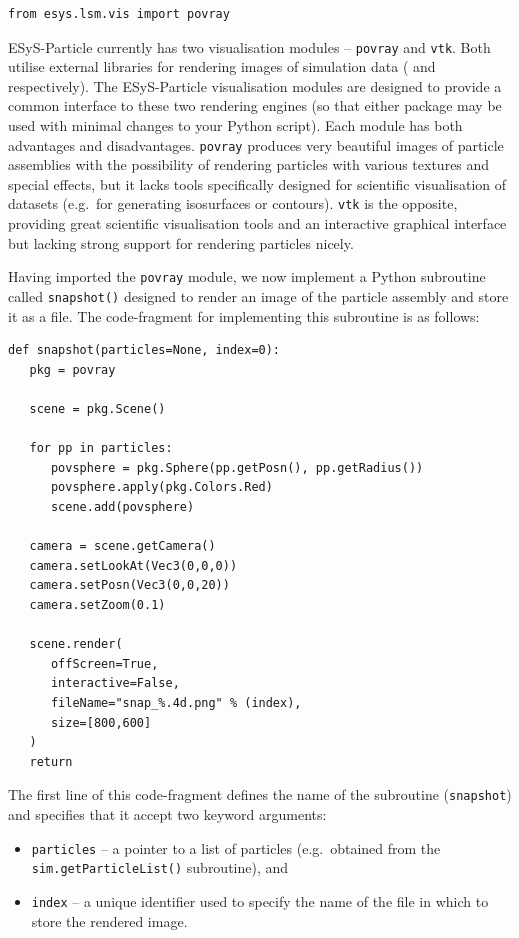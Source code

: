 \begin{verbatim}
from esys.lsm.vis import povray
\end{verbatim}

\noindent
ESyS-Particle currently has two visualisation modules -- \texttt{povray} and \texttt{vtk}. Both utilise external libraries for rendering images of simulation data ( and  respectively). The ESyS-Particle visualisation modules are designed to provide a common interface to these two rendering engines (so that either package may be used with minimal changes to your Python script). Each module has both advantages and disadvantages. \texttt{povray} produces very beautiful images of particle assemblies with the possibility of rendering particles with various textures and special effects, but it lacks tools specifically designed for scientific visualisation of datasets (e.g.\ for generating isosurfaces or contours). \texttt{vtk} is the opposite, providing great scientific visualisation tools and an interactive graphical interface but lacking strong support for rendering particles nicely. 

Having imported the \texttt{povray} module, we now implement a Python subroutine called \texttt{snapshot()} designed to render an image of the particle assembly and store it as a file. The code-fragment for implementing this subroutine is as follows:

\begin{verbatim}
def snapshot(particles=None, index=0):
   pkg = povray

   scene = pkg.Scene()

   for pp in particles:
      povsphere = pkg.Sphere(pp.getPosn(), pp.getRadius())
      povsphere.apply(pkg.Colors.Red)
      scene.add(povsphere)

   camera = scene.getCamera()
   camera.setLookAt(Vec3(0,0,0))
   camera.setPosn(Vec3(0,0,20))
   camera.setZoom(0.1)

   scene.render(
      offScreen=True, 
      interactive=False, 
      fileName="snap_%.4d.png" % (index), 
      size=[800,600]
   )
   return
\end{verbatim}

\noindent
The first line of this code-fragment defines the name of the subroutine (\texttt{snapshot}) and specifies that it accept two keyword arguments: 
\begin{itemize}
\item \texttt{particles} -- a pointer to a list of particles (e.g.\ obtained from the \texttt{sim.getPar\+tic\+leList()} subroutine), and
\item \texttt{index} -- a unique identifier used to specify the name of the file in which to store the rendered image. 
\end{itemize}

